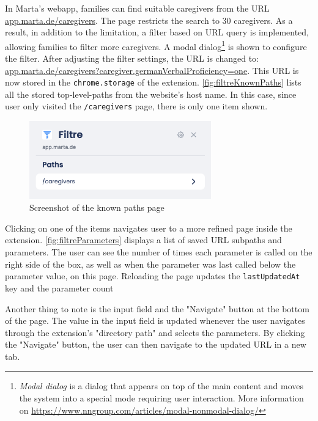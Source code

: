 In Marta's webapp, families can find suitable caregivers from the URL \url{app.marta.de/caregivers}. The page restricts the search to 30 caregivers. As a result, in addition to the limitation, a filter based on URL query is implemented, allowing families to filter more caregivers. A modal dialog\footnote{\emph{Modal dialog} is a dialog that appears on top of the main content and moves the system into a special mode requiring user interaction. More information on \url{https://www.nngroup.com/articles/modal-nonmodal-dialog/}} is shown to configure the filter. After adjusting the filter settings, the URL is changed to: \url{app.marta.de/caregivers?caregiver.germanVerbalProficiency=one}. This URL is now stored in the \texttt{chrome.storage} of the extension. \autoref{fig:filtreKnownPaths} lists all the stored top-level-paths from the website's host name. In this case, since user only visited the \texttt{/caregivers} page, there is only one item shown.

\begin{figure}[H]
  \centering
  \includegraphics[width=0.7\textwidth]{assets/Filtre_known_paths.png}
  \caption{Screenshot of the known paths page}
  \label{fig:filtreKnownPaths}
\end{figure}

Clicking on one of the items navigates user to a more refined page inside the extension. \autoref{fig:filtreParameters} displays a list of saved URL subpaths and parameters. The user can see the number of times each parameter is called on the right side of the box, as well as when the parameter was last called below the parameter value, on this page. Reloading the page updates the \texttt{lastUpdatedAt} key and the parameter count

Another thing to note is the input field and the "Navigate" button at the bottom of the page. The value in the input field is updated whenever the user navigates through the extension's "directory path" and selects the parameters. By clicking the "Navigate" button, the user can then navigate to the updated URL in a new tab.


